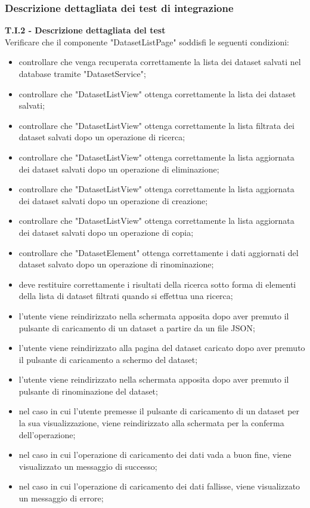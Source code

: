 \subsubsection{Descrizione dettagliata dei test di integrazione}
\label{sec:descr_ti}
\textbf{T.I.2 - Descrizione dettagliata del test}\\
Verificare che il componente "DatasetListPage" soddisfi le seguenti condizioni:
\label{ti:descr_ti2}
\begin{itemize}
    \item controllare che venga recuperata correttamente la lista dei dataset salvati nel database tramite "DatasetService";%
    \item controllare che "DatasetListView" ottenga correttamente la lista dei dataset salvati;%
    \item controllare che "DatasetListView" ottenga correttamente la lista filtrata dei dataset salvati dopo un operazione di ricerca;
    \item controllare che "DatasetListView" ottenga correttamente la lista aggiornata dei dataset salvati dopo un operazione di eliminazione;%
    \item controllare che "DatasetListView" ottenga correttamente la lista aggiornata dei dataset salvati dopo un operazione di creazione;%
    \item controllare che "DatasetListView" ottenga correttamente la lista aggiornata dei dataset salvati dopo un operazione di copia;%
    \item controllare che "DatasetElement" ottenga correttamente i dati aggiornati del dataset salvato dopo un operazione di rinominazione;
    \item deve restituire correttamente i risultati della ricerca sotto forma di elementi della lista di dataset filtrati quando si effettua una ricerca;
    \item l'utente viene reindirizzato nella schermata apposita dopo aver premuto il pulsante di caricamento di un dataset a partire da un file JSON;
    \item l'utente viene reindirizzato alla pagina del dataset caricato dopo aver premuto il pulsante di caricamento a schermo del dataset;%
    \item l'utente viene reindirizzato nella schermata apposita dopo aver premuto il pulsante di rinominazione del dataset;%
    \item nel caso in cui l'utente premesse il pulsante di caricamento di un dataset per la sua visualizzazione, viene reindirizzato alla schermata per la conferma dell'operazione;
    \item nel caso in cui l'operazione di caricamento dei dati vada a buon fine, viene visualizzato un messaggio di successo;%
    \item nel caso in cui l'operazione di caricamento dei dati fallisse, viene visualizzato un messaggio di errore;
\end{itemize}